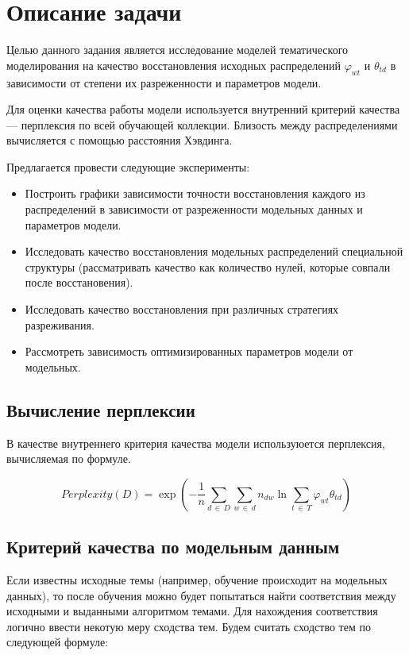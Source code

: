 \documentclass[12pt]{article}
\begin{document}
\section{Описание задачи}

Целью данного задания является исследование моделей тематического моделирования на качество восстановления исходных распределений $ \varphi_{wt} $ и $ \theta_{td} $ в зависимости от степени их разреженности и параметров модели.

Для оценки качества работы модели используется внутренний критерий качества --- перплексия по всей обучающей коллекции. 
Близость между распределениями вычисляется с помощью расстояния Хэвдинга.

Предлагается провести следующие эксперименты:

\begin{itemize}
  \item{Построить графики зависимости точности восстановления каждого из распределений в зависимости от разреженности модельных данных и параметров модели.}
  \item{Исследовать качество восстановления модельных распределений специальной структуры (рассматривать качество как количество нулей, которые совпали после восстановения).}
  \item{Исследовать качество восстановления при различных стратегиях разреживания.}
  \item{Рассмотреть зависимость оптимизированных параметров модели от модельных.}
\end{itemize}

\subsection{Вычисление перплексии}

В качестве внутреннего критерия качества модели используюется перплексия, вычисляемая по формуле.

\[
  Perplexity(D) = 
    \exp\left(
      -\frac1{n}\sum_{d\,\in\,D} \sum_{w\,\in\,d} n_{dw} \ln\sum_{t\,\in\,T} \varphi_{wt} \theta_{td}
    \right)
\]

\subsection{Критерий качества по модельным данным}

Если известны исходные темы (например, обучение происходит на модельных данных), то после обучения можно будет попытаться найти соответствия между исходными и выданными алгоритмом темами.
Для нахождения соответствия логично ввести некотую меру сходства тем.
Будем считать сходство тем по следующей формуле:
\end{document}
